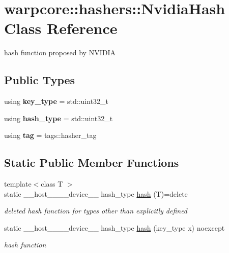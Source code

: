 \hypertarget{classwarpcore_1_1hashers_1_1NvidiaHash}{}\section{warpcore\+:\+:hashers\+:\+:Nvidia\+Hash Class Reference}
\label{classwarpcore_1_1hashers_1_1NvidiaHash}


hash function proposed by N\+V\+I\+D\+IA  


\subsection*{Public Types}
\begin{DoxyCompactItemize}
\item 
\mbox{\label{classwarpcore_1_1hashers_1_1NvidiaHash_a3a9a637b8f756fc4a83139e91a13c78d}} 
using {\bfseries key\+\_\+type} = std\+::uint32\+\_\+t
\item 
\mbox{\label{classwarpcore_1_1hashers_1_1NvidiaHash_a0b44b557219bbe3ae15f942ed845eac5}} 
using {\bfseries hash\+\_\+type} = std\+::uint32\+\_\+t
\item 
\mbox{\label{classwarpcore_1_1hashers_1_1NvidiaHash_a21f412ce0bf2ea966a246f558d4fb0e6}} 
using {\bfseries tag} = tags\+::hasher\+\_\+tag
\end{DoxyCompactItemize}
\subsection*{Static Public Member Functions}
\begin{DoxyCompactItemize}
\item 
{\footnotesize template$<$class T $>$ }\\static \+\_\+\+\_\+host\+\_\+\+\_\+\+\_\+\+\_\+device\+\_\+\+\_\+ hash\+\_\+type \hyperlink{classwarpcore_1_1hashers_1_1NvidiaHash_acb6c24c9eaba45db786a261978f8f2ba}{hash} (T)=delete
\begin{DoxyCompactList}\small\item\em deleted hash function for types other than explicitly defined \end{DoxyCompactList}\item 
static \+\_\+\+\_\+host\+\_\+\+\_\+\+\_\+\+\_\+device\+\_\+\+\_\+ hash\+\_\+type \hyperlink{classwarpcore_1_1hashers_1_1NvidiaHash_ad86796fdcf66b02789ec16f6d0936f3a}{hash} (key\+\_\+type x) noexcept
\begin{DoxyCompactList}\small\item\em hash function \end{DoxyCompactList}\end{DoxyCompactItemize}


